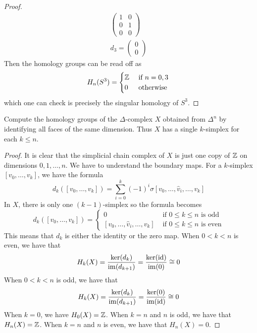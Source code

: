 \documentclass[a4paper]{article}
\begin{document}
\begin{ex}{}{}
\begin{proof}
\begin{gather*}
\begin{pmatrix}
1 & 0\\
0 & 1\\
0 & 0
\end{pmatrix}\\
d_3=\begin{pmatrix}
0\\
0
\end{pmatrix}
\end{gather*}
Then the homology groups can be read off as $$H_n(S^3)=\begin{cases}
\mathbb{Z} & \text{ if } n=0,3\\
0 & \text{ otherwise }
\end{cases}$$
which one can check is precisely the singular homology of $S^3$. 
\end{proof}
\end{ex}

\begin{ex}{}{} Compute the homology groups of the $\Delta$-complex $X$ obtained from $\Delta^n$ by identifying all faces of the same dimension. Thus $X$ has a single $k$-simplex for each $k\leq n$. \tcbline
\begin{proof}
It is clear that the simplicial chain complex of $X$ is just one copy of $\mathbb{Z}$ on dimensions $0,1,\dots,n$. We have to understand the boundary maps. For a $k$-simplex $[v_0,\dots,v_k]$, we have the formula $$d_k([v_0,\dots,v_k])=\sum_{i=0}^k(-1)^i\sigma[v_0,\dots,\hat{v}_i,\dots,v_k]$$ In $X$, there is only one $(k-1)$-simplex so the formula becomes $$d_k([v_0,\dots,v_k])=\begin{cases}
0 & \text{ if } 0\leq k\leq n \text{ is odd}\\
[v_0,\dots,\hat{v}_i,\dots,v_k] & \text{ if } 0\leq k\leq n \text{ is even}
\end{cases}$$
This means that $d_k$ is either the identity or the zero map. When $0<k<n$ is even, we have that $$H_k(X)=\frac{\ker(d_k)}{\operatorname{im}(d_{k+1})}=\frac{\ker(\text{id})}{\operatorname{im}(0)}\cong 0$$ When $0<k<n$ is odd, we have that $$H_k(X)=\frac{\ker(d_k)}{\operatorname{im}(d_{k+1})}=\frac{\ker(0)}{\operatorname{im}(\text{id})}\cong 0$$ When $k=0$, we have $H_0(X)=\mathbb{Z}$. When $k=n$ and $n$ is odd, we have that $H_n(X)=\mathbb{Z}$. When $k=n$ and $n$ is even, we have that $H_n(X)=0$. 
\end{proof}
\end{ex}
\end{document}
